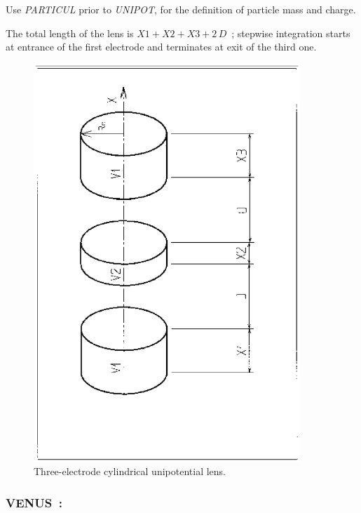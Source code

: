 \medskip

\noindent Use \textsl{PARTICUL} prior to \textsl{UNIPOT}, for the
 definition of particle mass and charge.

\medskip

\noindent The total length of the lens is $X1+X2+X3+2\,D$~; stepwise integration starts 
at entrance of the first electrode and terminates at exit of the third one. 

\vfill

\begin{figure}[H]
\centerline{\includegraphics[height=15cm,angle=-90]{Fig31.ps}}
\caption{\label{fig31}Three-electrode cylindrical unipotential lens.}
\end{figure}
\vfill

\newpage

\subsubsection*{VENUS~: \VENUSTitl}  \label{VENUS}
\medskip 
{} 

